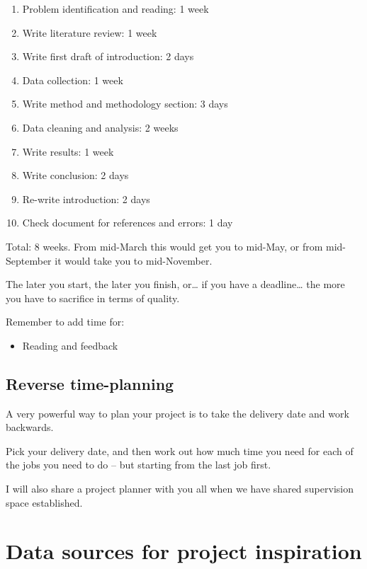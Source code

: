 \documentclass[
]{book}
\providecommand{\tightlist}{%
  \setlength{\itemsep}{0pt}\setlength{\parskip}{0pt}}
\begin{document}
\begin{enumerate}
\def\labelenumi{\arabic{enumi}.}
\item
  Problem identification and reading: 1 week
\item
  Write literature review: 1 week
\item
  Write first draft of introduction: 2 days
\item
  Data collection: 1 week
\item
  Write method and methodology section: 3 days
\item
  Data cleaning and analysis: 2 weeks
\item
  Write results: 1 week
\item
  Write conclusion: 2 days
\item
  Re-write introduction: 2 days
\item
  Check document for references and errors: 1 day
\end{enumerate}

Total: 8 weeks. From mid-March this would get you to mid-May, or from
mid-September it would take you to mid-November.

The later you start, the later you finish, or\ldots{} if you have a
deadline\ldots{} the more you have to sacrifice in terms of quality.

Remember to add time for:

\begin{itemize}
\tightlist
\item
  Reading and feedback
\end{itemize}

\hypertarget{reverse-time-planning}{%
\section{Reverse time-planning}\label{reverse-time-planning}}

A very powerful way to plan your project is to take the delivery date
and work backwards.

Pick your delivery date, and then work out how much time you need for
each of the jobs you need to do -- but starting from the last job first.

I will also share a project planner with you all when we have shared
supervision space established.

\hypertarget{data-sources-for-project-inspiration}{%
\chapter{Data sources for project inspiration}\label{data-sources-for-project-inspiration}}
\end{document}
